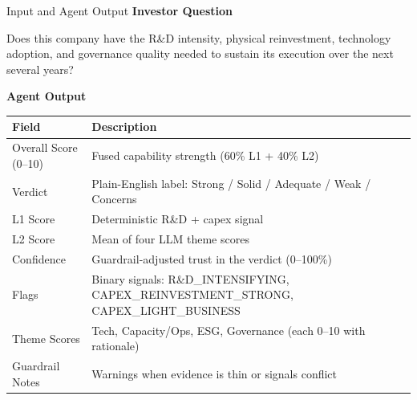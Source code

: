 \documentclass[aspectratio=169]{beamer}
\begin{document}
\begin{frame}{Input and Agent Output}
\textbf{Investor Question}
\vspace{0.2cm}

Does this company have the R\&D intensity, physical reinvestment, technology
adoption, and governance quality needed to sustain its execution over the next
several years?

\vspace{0.3cm}
\textbf{Agent Output}
\begin{table}[h]
\centering
\small
\begin{tabular}{p{4.0cm} p{7.0cm}}
\hline
\textbf{Field} & \textbf{Description} \\
\hline
Overall Score (0--10) & Fused capability strength (60\% L1 + 40\% L2) \\
Verdict & Plain-English label: Strong / Solid / Adequate / Weak / Concerns \\
L1 Score & Deterministic R\&D + capex signal \\
L2 Score & Mean of four LLM theme scores \\
Confidence & Guardrail-adjusted trust in the verdict (0--100\%) \\
Flags & Binary signals: R\&D\_INTENSIFYING, CAPEX\_REINVESTMENT\_STRONG, CAPEX\_LIGHT\_BUSINESS \\
Theme Scores & Tech, Capacity/Ops, ESG, Governance (each 0--10 with rationale) \\
Guardrail Notes & Warnings when evidence is thin or signals conflict \\
\hline
\end{tabular}
\end{table}
\end{frame}
\end{document}
